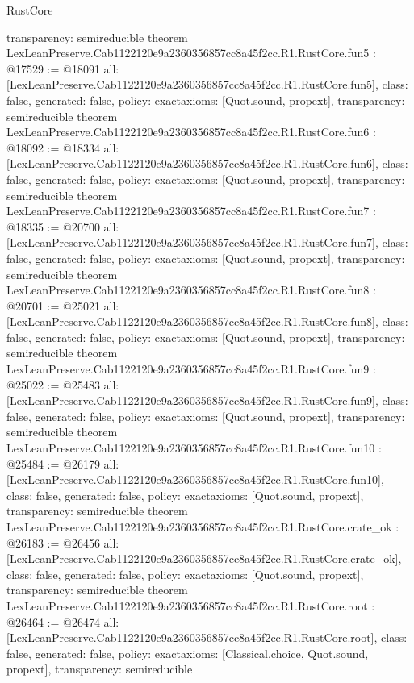\begin{lexlean}{RustCore}
\begin{coremodule}
{  transparency: semireducible
}
theorem LexLeanPreserve.Cab1122120e9a2360356857cc8a45f2cc.R1.RustCore.fun5 : @17529 := @18091 {
  all: [LexLeanPreserve.Cab1122120e9a2360356857cc8a45f2cc.R1.RustCore.fun5],
  class: false,
  generated: false,
  policy: exact{axioms: [Quot.sound, propext]},
  transparency: semireducible
}
theorem LexLeanPreserve.Cab1122120e9a2360356857cc8a45f2cc.R1.RustCore.fun6 : @18092 := @18334 {
  all: [LexLeanPreserve.Cab1122120e9a2360356857cc8a45f2cc.R1.RustCore.fun6],
  class: false,
  generated: false,
  policy: exact{axioms: [Quot.sound, propext]},
  transparency: semireducible
}
theorem LexLeanPreserve.Cab1122120e9a2360356857cc8a45f2cc.R1.RustCore.fun7 : @18335 := @20700 {
  all: [LexLeanPreserve.Cab1122120e9a2360356857cc8a45f2cc.R1.RustCore.fun7],
  class: false,
  generated: false,
  policy: exact{axioms: [Quot.sound, propext]},
  transparency: semireducible
}
theorem LexLeanPreserve.Cab1122120e9a2360356857cc8a45f2cc.R1.RustCore.fun8 : @20701 := @25021 {
  all: [LexLeanPreserve.Cab1122120e9a2360356857cc8a45f2cc.R1.RustCore.fun8],
  class: false,
  generated: false,
  policy: exact{axioms: [Quot.sound, propext]},
  transparency: semireducible
}
theorem LexLeanPreserve.Cab1122120e9a2360356857cc8a45f2cc.R1.RustCore.fun9 : @25022 := @25483 {
  all: [LexLeanPreserve.Cab1122120e9a2360356857cc8a45f2cc.R1.RustCore.fun9],
  class: false,
  generated: false,
  policy: exact{axioms: [Quot.sound, propext]},
  transparency: semireducible
}
theorem LexLeanPreserve.Cab1122120e9a2360356857cc8a45f2cc.R1.RustCore.fun10 : @25484 := @26179 {
  all: [LexLeanPreserve.Cab1122120e9a2360356857cc8a45f2cc.R1.RustCore.fun10],
  class: false,
  generated: false,
  policy: exact{axioms: [Quot.sound, propext]},
  transparency: semireducible
}
theorem LexLeanPreserve.Cab1122120e9a2360356857cc8a45f2cc.R1.RustCore.crate_ok : @26183 := @26456 {
  all: [LexLeanPreserve.Cab1122120e9a2360356857cc8a45f2cc.R1.RustCore.crate_ok],
  class: false,
  generated: false,
  policy: exact{axioms: [Quot.sound, propext]},
  transparency: semireducible
}
theorem LexLeanPreserve.Cab1122120e9a2360356857cc8a45f2cc.R1.RustCore.root : @26464 := @26474 {
  all: [LexLeanPreserve.Cab1122120e9a2360356857cc8a45f2cc.R1.RustCore.root],
  class: false,
  generated: false,
  policy: exact{axioms: [Classical.choice, Quot.sound, propext]},
  transparency: semireducible
}


\end{coremodule}
\end{lexlean}
